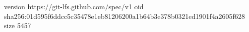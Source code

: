 version https://git-lfs.github.com/spec/v1
oid sha256:01d595f6ddcc5c35478e1eb81206200a1b64b3e378b0321ed1901f4a2605f628
size 5457
